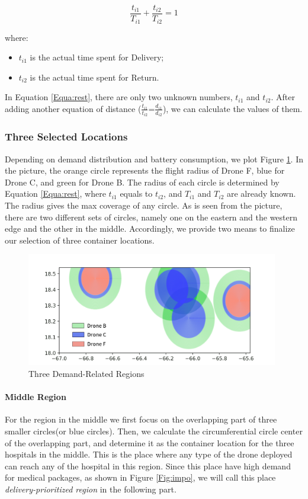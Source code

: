 \documentclass{mcmthesis}
\begin{document}
\begin{equation}\label{Equa:rest}
\frac{t_{i1}}{T_{i1}}+\frac{t_{i2}}{T_{i2}} = 1
\end{equation}

where:

\begin{itemize}
    \item $t_{i1}$ is the actual time spent for Delivery;
    \item $t_{i2}$ is the actual time spent for Return.
\end{itemize}

In Equation \eqref{Equa:rest}, there are only two unknown numbers, $t_{i1}$ and $t_{i2}$. After adding another equation of distance ($\frac{t_{i1}}{t_{i2}}$=$\frac{d_{i1}}{d_{i2}}$), we can calculate the values of them.


\subsubsection{Three Selected Locations}
Depending on demand distribution and battery consumption, we plot Figure \ref{Fig:circ}. In the picture, the orange circle represents the flight radius of Drone F, blue for Drone C, and green for Drone B. The radius of each circle is determined by Equation \eqref{Equa:rest}, where $t_{i1}$ equals to $t_{i2}$, and $T_{i1}$ and $T_{i2}$ are already known. The radius gives the max coverage of any circle. As is seen from the picture, there are two different sets of circles, namely one on the eastern and the western edge and the other in the middle. Accordingly, we provide two means to finalize our selection of three container locations.

\begin{figure}[htbp]
    \centering
    \includegraphics[width=11cm]{figures/radius4.png}
    \caption{Three Demand-Related Regions}
    \label{Fig:circ}
\end{figure}

\paragraph{Middle Region} For the region in the middle we first focus on the overlapping part of three smaller circles(or blue circles). Then, we calculate the circumferential circle center of the overlapping part, and determine it as the container location for the three hospitals in the middle. This is the place where any type of the drone deployed can reach any of the hospital in this region. Since this place have high demand for medical packages, as shown in Figure \ref{Fig:impo}, we will call this place \emph{delivery-prioritized region} in the following part.
\end{document}
